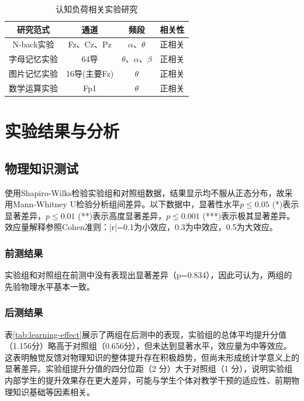\documentclass[runningheads]{llncs}
\begin{document}
\begin{table}
  \centering
  \setlength{\tabcolsep}{8pt} %
  \caption{认知负荷相关实验研究}
  \begin{tabular}{cccc}
    \toprule
    研究范式 & 通道 & 频段 & 相关性                  \\
    \midrule
    N-back实验\cite{pergher2019mental} & Fz、Cz、Pz & $\alpha$、$\theta$ & 正相关\\
    字母记忆实验\cite{bashivan2015single} & 64导 & $\theta$、$\alpha$、$\beta$ & 正相关                    \\
    图片记忆实验\cite{zhang2016functional} & 16导(主要Fz) & $\theta$ & 正相关   \\
    数学运算实验\cite{so2017evaluation} & Fp1 & $\theta$ & 正相关  \\
    \bottomrule
  \end{tabular}
  \label{tab:1}
\end{table}

\section{实验结果与分析}
\subsection{物理知识测试}
使用Shapiro-Wilks检验实验组和对照组数据，结果显示均不服从正态分布，故采用Mann-Whitney U检验分析组间差异。以下数据中，显著性水平$p \le 0.05$ (*)表示显著差异，$p \le 0.01$ (**)表示高度显著差异，$p \le 0.001$ (***)表示极其显著差异。效应量解释参照Cohen准则：|r|=0.1为小效应，0.3为中效应，0.5为大效应。

\subsubsection{前测结果}
实验组和对照组在前测中没有表现出显著差异（p=0.834），因此可认为，两组的先验物理水平基本一致。

\subsubsection{后测结果}
表\ref{tab:learning-effect}展示了两组在后测中的表现，实验组的总体平均提升分值（1.156分）略高于对照组（0.656分），但未达到显著水平，效应量为中等效应。这表明触觉反馈对物理知识的整体提升存在积极趋势，但尚未形成统计学意义上的显著差异。实验组提升分值的四分位距（2 分）大于对照组（1 分），说明实验组内部学生的提升效果存在更大差异，可能与学生个体对教学干预的适应性、前期物理知识基础等因素相关。
\end{document}
